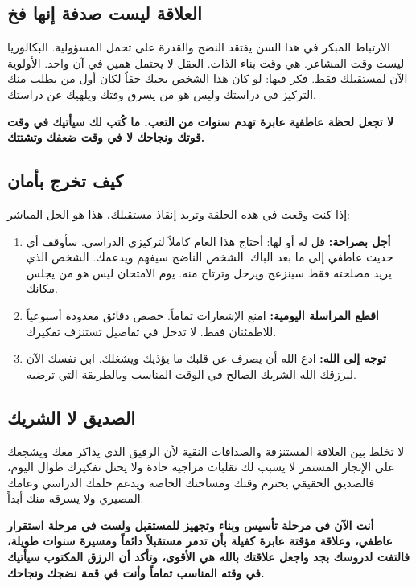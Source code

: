 \documentclass[12pt,a4paper]{book}
\newcommand{\importantAr}[1]{%
	\begin{important}
		\bfseries #1
	\end{important}
}
\begin{document}
	\subsection{العلاقة ليست صدفة إنها فخ}
	
	الارتباط المبكر في هذا السن يفتقد النضج والقدرة على تحمل المسؤولية. البكالوريا ليست وقت المشاعر. هي وقت بناء الذات. العقل لا يحتمل همين في آن واحد. الأولوية الآن لمستقبلك فقط. فكر فيها: لو كان هذا الشخص يحبك حقاً لكان أول من يطلب منك التركيز في دراستك وليس هو من يسرق وقتك ويلهيك عن دراستك.
	
	\importantAr{لا تجعل لحظة عاطفية عابرة تهدم سنوات من التعب. ما كُتب لك سيأتيك في وقت قوتك ونجاحك لا في وقت ضعفك وتشتتك.}
	
	\subsection{كيف تخرج بأمان}
	
	إذا كنت وقعت في هذه الحلقة وتريد إنقاذ مستقبلك، هذا هو الحل المباشر:
	
	\begin{enumerate}
		\item \textbf{أجل بصراحة:} قل له أو لها: أحتاج هذا العام كاملاً لتركيزي الدراسي. سأوقف أي حديث عاطفي إلى ما بعد الباك. الشخص الناضج سيفهم ويدعمك. الشخص الذي يريد مصلحته فقط سينزعج ويرحل وترتاح منه. يوم الامتحان ليس هو من يجلس مكانك.
		
		\item \textbf{اقطع المراسلة اليومية:} امنع الإشعارات تماماً. خصص دقائق معدودة أسبوعياً للاطمئنان فقط. لا تدخل في تفاصيل تستنزف تفكيرك.
		
		\item \textbf{توجه إلى الله:} ادع الله أن يصرف عن قلبك ما يؤذيك ويشغلك. ابن نفسك الآن ليرزقك الله الشريك الصالح في الوقت المناسب وبالطريقة التي ترضيه.
	\end{enumerate}
	
	\subsection{الصديق لا الشريك}
	
	لا تخلط بين العلاقة المستنزفة والصداقات النقية لأن الرفيق الذي يذاكر معك ويشجعك على الإنجاز المستمر لا يسبب لك تقلبات مزاجية حادة ولا يحتل تفكيرك طوال اليوم، فالصديق الحقيقي يحترم وقتك ومساحتك الخاصة ويدعم حلمك الدراسي وعامك المصيري ولا يسرقه منك أبداً.
	
	\importantAr{أنت الآن في مرحلة تأسيس وبناء وتجهيز للمستقبل ولست في مرحلة استقرار عاطفي، وعلاقة مؤقتة عابرة كفيلة بأن تدمر مستقبلاً دائماً ومسيرة سنوات طويلة، فالتفت لدروسك بجد واجعل علاقتك بالله هي الأقوى، وتأكد أن الرزق المكتوب سيأتيك في وقته المناسب تماماً وأنت في قمة نضجك ونجاحك.}
	
\end{document}
